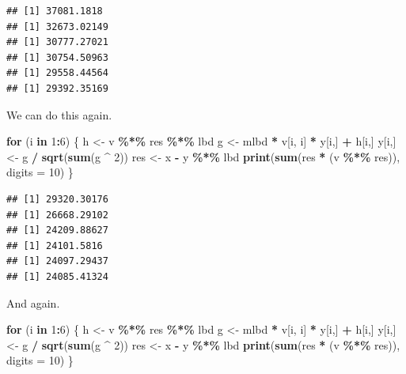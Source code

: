 \documentclass[
  12pt,
]{article}
\newenvironment{Shaded}{\begin{snugshade}}{\end{snugshade}}
\newcommand{\AttributeTok}[1]{\textcolor[rgb]{0.13,0.29,0.53}{#1}}
\newcommand{\ControlFlowTok}[1]{\textcolor[rgb]{0.13,0.29,0.53}{\textbf{#1}}}
\newcommand{\DecValTok}[1]{\textcolor[rgb]{0.00,0.00,0.81}{#1}}
\newcommand{\FunctionTok}[1]{\textcolor[rgb]{0.13,0.29,0.53}{\textbf{#1}}}
\newcommand{\NormalTok}[1]{#1}
\newcommand{\OtherTok}[1]{\textcolor[rgb]{0.56,0.35,0.01}{#1}}
\newcommand{\SpecialCharTok}[1]{\textcolor[rgb]{0.81,0.36,0.00}{\textbf{#1}}}
\begin{document}
\begin{verbatim}
## [1] 37081.1818
## [1] 32673.02149
## [1] 30777.27021
## [1] 30754.50963
## [1] 29558.44564
## [1] 29392.35169
\end{verbatim}

We can do this again.

\begin{Shaded}
\begin{Highlighting}[]
\ControlFlowTok{for}\NormalTok{ (i }\ControlFlowTok{in} \DecValTok{1}\SpecialCharTok{:}\DecValTok{6}\NormalTok{) \{}
\NormalTok{  h }\OtherTok{\textless{}{-}}\NormalTok{ v }\SpecialCharTok{\%*\%}\NormalTok{ res }\SpecialCharTok{\%*\%}\NormalTok{ lbd}
\NormalTok{  g }\OtherTok{\textless{}{-}}\NormalTok{ mlbd }\SpecialCharTok{*}\NormalTok{ v[i, i] }\SpecialCharTok{*}\NormalTok{ y[i,] }\SpecialCharTok{+}\NormalTok{ h[i,]}
\NormalTok{  y[i,] }\OtherTok{\textless{}{-}}\NormalTok{ g }\SpecialCharTok{/} \FunctionTok{sqrt}\NormalTok{(}\FunctionTok{sum}\NormalTok{(g }\SpecialCharTok{\^{}} \DecValTok{2}\NormalTok{))}
\NormalTok{  res }\OtherTok{\textless{}{-}}\NormalTok{ x }\SpecialCharTok{{-}}\NormalTok{ y }\SpecialCharTok{\%*\%}\NormalTok{ lbd}
  \FunctionTok{print}\NormalTok{(}\FunctionTok{sum}\NormalTok{(res }\SpecialCharTok{*}\NormalTok{ (v }\SpecialCharTok{\%*\%}\NormalTok{ res)), }\AttributeTok{digits =} \DecValTok{10}\NormalTok{)}
\NormalTok{\}}
\end{Highlighting}
\end{Shaded}

\begin{verbatim}
## [1] 29320.30176
## [1] 26668.29102
## [1] 24209.88627
## [1] 24101.5816
## [1] 24097.29437
## [1] 24085.41324
\end{verbatim}

And again.

\begin{Shaded}
\begin{Highlighting}[]
\ControlFlowTok{for}\NormalTok{ (i }\ControlFlowTok{in} \DecValTok{1}\SpecialCharTok{:}\DecValTok{6}\NormalTok{) \{}
\NormalTok{  h }\OtherTok{\textless{}{-}}\NormalTok{ v }\SpecialCharTok{\%*\%}\NormalTok{ res }\SpecialCharTok{\%*\%}\NormalTok{ lbd}
\NormalTok{  g }\OtherTok{\textless{}{-}}\NormalTok{ mlbd }\SpecialCharTok{*}\NormalTok{ v[i, i] }\SpecialCharTok{*}\NormalTok{ y[i,] }\SpecialCharTok{+}\NormalTok{ h[i,]}
\NormalTok{  y[i,] }\OtherTok{\textless{}{-}}\NormalTok{ g }\SpecialCharTok{/} \FunctionTok{sqrt}\NormalTok{(}\FunctionTok{sum}\NormalTok{(g }\SpecialCharTok{\^{}} \DecValTok{2}\NormalTok{))}
\NormalTok{  res }\OtherTok{\textless{}{-}}\NormalTok{ x }\SpecialCharTok{{-}}\NormalTok{ y }\SpecialCharTok{\%*\%}\NormalTok{ lbd}
  \FunctionTok{print}\NormalTok{(}\FunctionTok{sum}\NormalTok{(res }\SpecialCharTok{*}\NormalTok{ (v }\SpecialCharTok{\%*\%}\NormalTok{ res)), }\AttributeTok{digits =} \DecValTok{10}\NormalTok{)}
\NormalTok{\}}
\end{Highlighting}
\end{Shaded}
\end{document}
